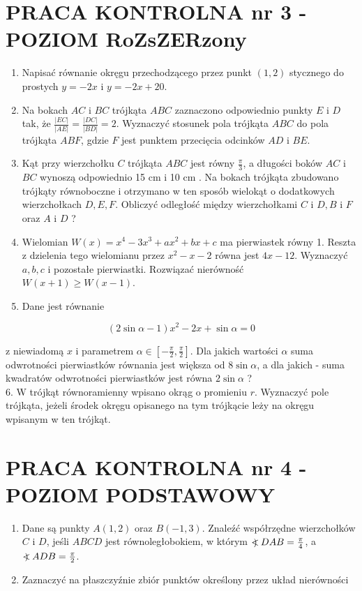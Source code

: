 \documentclass[10pt]{article}
\newcommand\Varangle{\mathop{{<\!\!\!\!\!\text{\small)}}\:}\nolimits}
\begin{document}
\section*{PRACA KONTROLNA nr 3 - POZIOM RoZsZERzony}
\begin{enumerate}
  \item Napisać równanie okręgu przechodzącego przez punkt $(1,2)$ stycznego do prostych $y=-2 x$ i $y=-2 x+20$.
  \item Na bokach $A C$ i $B C$ trójkąta $A B C$ zaznaczono odpowiednio punkty $E$ i $D$ tak, że $\frac{|E C|}{|A E|}=\frac{|D C|}{|B D|}=2$. Wyznaczyć stosunek pola trójkąta $A B C$ do pola trójkąta $A B F$, gdzie $F$ jest punktem przecięcia odcinków $A D$ i $B E$.
  \item Kąt przy wierzchołku $C$ trójkąta $A B C$ jest równy $\frac{\pi}{3}$, a długości boków $A C$ i $B C$ wynoszą odpowiednio 15 cm i 10 cm . Na bokach trójkąta zbudowano trójkąty równoboczne i otrzymano w ten sposób wielokąt o dodatkowych wierzchołkach $D, E, F$. Obliczyć odległość między wierzchołkami $C$ i $D, B$ i $F$ oraz $A$ i $D$ ?
  \item Wielomian $W(x)=x^{4}-3 x^{3}+a x^{2}+b x+c$ ma pierwiastek równy 1. Reszta z dzielenia tego wielomianu przez $x^{2}-x-2$ równa jest $4 x-12$. Wyznaczyć $a, b, c$ i pozostałe pierwiastki. Rozwiązać nierówność $W(x+1) \geqslant W(x-1)$.
  \item Dane jest równanie
\end{enumerate}

$$
(2 \sin \alpha-1) x^{2}-2 x+\sin \alpha=0
$$

z niewiadomą $x$ i parametrem $\alpha \in\left[-\frac{\pi}{2}, \frac{\pi}{2}\right]$. Dla jakich wartości $\alpha$ suma odwrotności pierwiastków równania jest większa od $8 \sin \alpha$, a dla jakich - suma kwadratów odwrotności pierwiastków jest równa $2 \sin \alpha$ ?\\
6. W trójkąt równoramienny wpisano okrąg o promieniu $r$. Wyznaczyć pole trójkąta, jeżeli środek okręgu opisanego na tym trójkącie leży na okręgu wpisanym w ten trójkąt.

\section*{PRACA KONTROLNA nr 4 - POZIOM PODSTAWOWY}
\begin{enumerate}
  \item Dane są punkty $A(1,2)$ oraz $B(-1,3)$. Znaleźć współrzędne wierzchołków $C$ i $D$, jeśli $A B C D$ jest równoległobokiem, w którym $\Varangle D A B=\frac{\pi}{4}$, a $\Varangle A D B=\frac{\pi}{2}$.
  \item Zaznaczyć na płaszczyźnie zbiór punktów określony przez układ nierówności
\end{enumerate}
\end{document}
